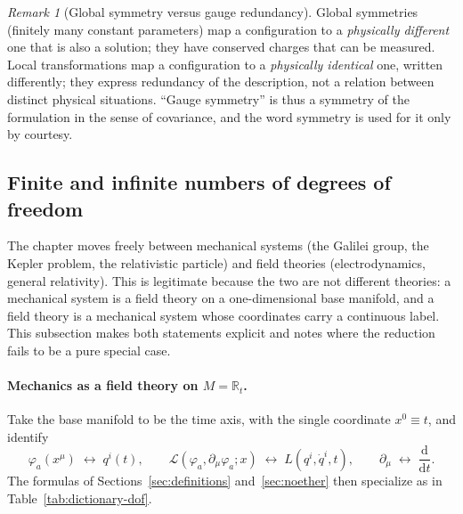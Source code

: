 \documentclass[11pt,a4paper,openany]{book}
\theoremstyle{definition}
\theoremstyle{plain}
\theoremstyle{remark}
\newtheorem{remark}{Remark}[chapter]
\newcommand{\dd}{\mathrm{d}}
\begin{document}
\begin{remark}[Global symmetry versus gauge redundancy]\label{rem:gauge}
Global symmetries (finitely many constant parameters) map a configuration to a
\emph{physically different} one that is also a solution; they have conserved
charges that can be measured. Local transformations map a configuration to
a \emph{physically identical} one, written differently; they express
redundancy of the description, not a relation between distinct physical
situations. ``Gauge symmetry'' is thus a symmetry of the formulation in the
sense of covariance, and the word symmetry is used for it only by courtesy.
\end{remark}

\subsection{Finite and infinite numbers of degrees of freedom}
\label{sec:dof}

The chapter moves freely between mechanical systems (the Galilei group, the
Kepler problem, the relativistic particle) and field theories
(electrodynamics, general relativity). This is legitimate because the two are
not different theories: a mechanical system is a field theory on a
one-dimensional base manifold, and a field theory is a mechanical system whose
coordinates carry a continuous label. This subsection makes both statements
explicit and notes where the reduction fails to be a pure special case.

\paragraph{Mechanics as a field theory on $M=\mathbb R_t$.}
Take the base manifold to be the time axis, with the single coordinate
$x^0\equiv t$, and identify
\begin{equation}\label{eq:dictionary-id}
  \varphi_a(x^\mu)\;\leftrightarrow\;q^i(t),\qquad
  \mathcal L(\varphi_a,\partial_\mu\varphi_a;x)\;\leftrightarrow\;L(q^i,\dot q^i,t),\qquad
  \partial_\mu\;\leftrightarrow\;\frac{\dd}{\dd t}.
\end{equation}
The formulas of Sections~\ref{sec:definitions} and~\ref{sec:noether} then
specialize as in Table~\ref{tab:dictionary-dof}.
\end{document}
